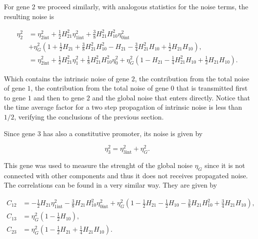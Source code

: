 For gene $2$ we proceed similarly, with analogous statistics for the noise terms, the resulting noise is

\begin{equation}
  \label{eq:etagene2}
  \begin{split}
    \eta_2^2 &= \eta_{2\text{int}}^2 +  \frac{1}{2}H_{21}^2\eta_{1\text{int}}^2+\frac{3}{8}H_{21}^2H_{10}^2\eta_{0\text{int}}^2\\
    &+\eta_G^2\left(1 + \frac{1}{2}H_{21} + \frac{3}{8}H_{21}^2H_{10}^2 - H_{21} -\frac{3}{4}H_{21}^2H_{10} + \frac{1}{2}H_{21}H_{10}\right),\\
    &= \eta_{2\text{int}}^2 + \frac{1}{2}H_{21}^2\eta_1^2+\frac{1}{8}H_{21}^2H_{10}^2\eta_0^2+\eta_G^2\left(1-H_{21}-\frac{1}{4}H_{21}^2H_{10}+\frac{1}{2}H_{21}H_{10}\right).
  \end{split}
\end{equation}

Which contains the intrinsic noise of gene $2$, the contribution from the total noise of gene $1$, the contribution from the total noise of gene $0$ that is transmitted first to gene $1$ and then to gene $2$ and the global noise that enters directly. Notice that the time average factor for a two step propagation of intrinsic noise is less than $1/2$, verifying the conclusions of the previous section.

Since gene $3$ has also a constitutive promoter, its noise is given by

\begin{equation}
  \label{eq:etagene3}
  \eta_3^2 = \eta_{3\text{int}}^2+\eta_G^2.
\end{equation}

This gene was used to measure the strenght of the global noise $\eta_G$ since it is not connected with other components and thus it does not receives propagated noise. The correlations can be found in a very similar way. They are given by

\begin{equation}
  \label{eq:lan-correl}
  \begin{split}
    C_{12}&=-\frac{1}{2}H_{21}\eta_{1\text{int}}^2 -\frac{3}{8}H_{21}H_{10}^2\eta_{0\text{int}}^2+\eta_G^2\left(1-\frac{1}{2}H_{21}-\frac{1}{2}H_{10}-\frac{3}{8}H_{21}H_{10}^2 + \frac{3}{4}H_{21}H_{10}\right),\\
    C_{13}&=\eta_G^2\left(1-\frac{1}{2}H_{10}\right),\\
    C_{23}&=\eta_G^2\left(1-\frac{1}{2}H_{21}+\frac{1}{4}H_{21}H_{10}\right).
  \end{split}
\end{equation}

